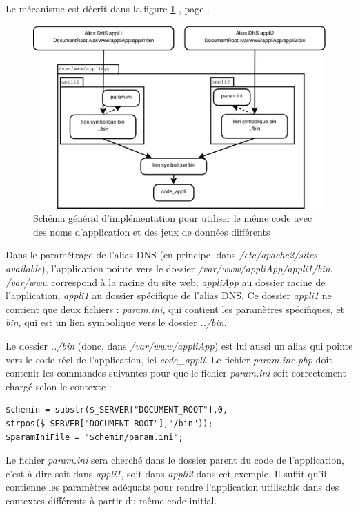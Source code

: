 Le mécanisme est décrit dans la figure \ref{dnsmultipleschema} \textit{}, page \pageref{dnsmultipleschema}.

\begin{figure}[H]
\includegraphics[width=\linewidth]{images/dnsmultiple}
\caption{\label{dnsmultipleschema}Schéma général d’implémentation pour utiliser le même code avec des noms d’application et des jeux de données différents}
\end{figure}

Dans le paramétrage de l’alias DNS (en principe, dans \textit{/etc/apache2/sites-available}), l’application pointe vers le dossier \textit{/var/www/appliApp/appli1/bin}. \textit{/var/www} correspond à la racine du site web, \textit{appliApp} au dossier racine de l’application, \textit{appli1} au dossier spécifique de l’alias DNS. Ce dossier \textit{appli1} ne contient que deux fichiers : \textit{param.ini}, qui contient les paramètres spécifiques, et \textit{bin}, qui est un lien symbolique vers le dossier \textit{../bin}.

Le dossier \textit{../bin} (donc, dans\textit{ /var/www/appliApp}) est lui aussi un alias qui pointe vers le code réel de l’application, ici \textit{code\_appli}. Le fichier \textit{param.inc.php} doit contenir les commandes suivantes pour que le fichier \textit{param.ini} soit correctement chargé selon le contexte :
\begin{lstlisting}
$chemin = substr($_SERVER["DOCUMENT_ROOT"],0, strpos($_SERVER["DOCUMENT_ROOT"],"/bin"));
$paramIniFile = "$chemin/param.ini";
\end{lstlisting}

Le fichier \textit{param.ini} sera cherché dans le dossier parent du code de l’application, c’est à dire soit dans \textit{appli1}, soit dans \textit{appli2} dans cet exemple. Il suffit qu’il contienne les paramètres adéquats pour rendre l’application utilisable dans des contextes différents à partir du même code initial.

